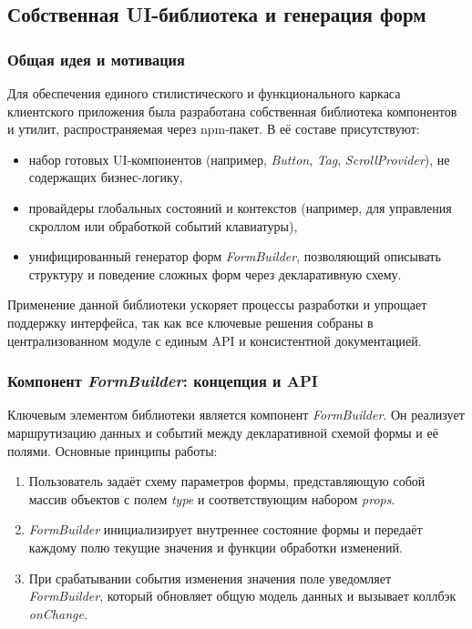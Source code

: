 \subsection{Собственная UI-библиотека и генерация форм}

\subsubsection{Общая идея и мотивация}
Для обеспечения единого стилистического и функционального каркаса клиентского приложения была разработана собственная библиотека компонентов и утилит, распространяемая через npm-пакет. В её составе присутствуют:
\begin{itemize}
  \item набор готовых UI-компонентов (например, \textit{Button}, \textit{Tag}, \textit{ScrollProvider}), не содержащих бизнес-логику,
  \item провайдеры глобальных состояний и контекстов (например, для управления скроллом или обработкой событий клавиатуры),
  \item унифицированный генератор форм \textit{FormBuilder}, позволяющий описывать структуру и поведение сложных форм через декларативную схему.
\end{itemize}
Применение данной библиотеки ускоряет процессы разработки и упрощает поддержку интерфейса, так как все ключевые решения собраны в централизованном модуле с единым API и консистентной документацией.

\subsubsection{Компонент \textit{FormBuilder}: концепция и API}
Ключевым элементом библиотеки является компонент \textit{FormBuilder}. Он реализует маршрутизацию данных и событий между декларативной схемой формы и её полями. Основные принципы работы:
\begin{enumerate}
  \item Пользователь задаёт схему параметров формы, представляющую собой массив объектов с полем \textit{type} и соответствующим набором \textit{props}.
  \item \textit{FormBuilder} инициализирует внутреннее состояние формы и передаёт каждому полю текущие значения и функции обработки изменений.
  \item При срабатывании события изменения значения поле уведомляет \textit{FormBuilder}, который обновляет общую модель данных и вызывает коллбэк \textit{onChange}.
\end{enumerate}

